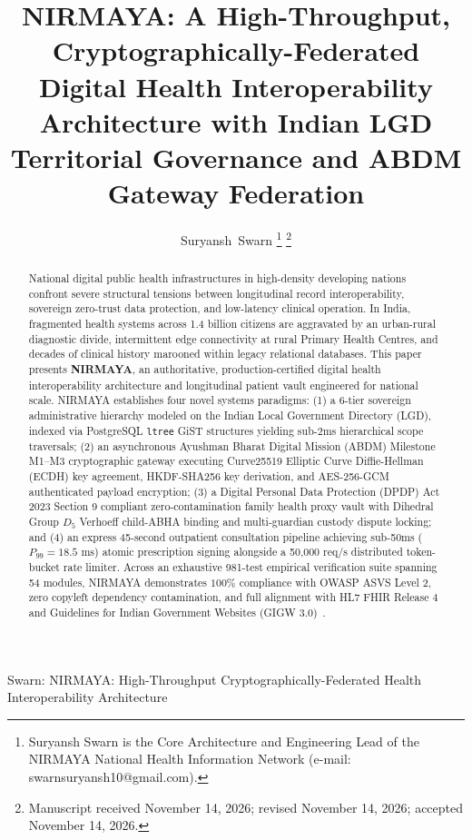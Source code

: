 \documentclass[journal,twocolumn]{IEEEtran}
\begin{document}
\title{NIRMAYA: A High-Throughput, Cryptographically-Federated Digital Health Interoperability Architecture with Indian LGD Territorial Governance and ABDM Gateway Federation}

\author{Suryansh~Swarn%
\thanks{Suryansh Swarn is the Core Architecture and Engineering Lead of the NIRMAYA National Health Information Network (e-mail: swarnsuryansh10@gmail.com).}%
\thanks{Manuscript received November 14, 2026; revised November 14, 2026; accepted November 14, 2026.}}

%
{Swarn: NIRMAYA: High-Throughput Cryptographically-Federated Health Interoperability Architecture}

\maketitle

\begin{abstract}
National digital public health infrastructures in high-density developing nations confront severe structural tensions between longitudinal record interoperability, sovereign zero-trust data protection, and low-latency clinical operation. In India, fragmented health systems across 1.4 billion citizens are aggravated by an urban-rural diagnostic divide, intermittent edge connectivity at rural Primary Health Centres, and decades of clinical history marooned within legacy relational databases. This paper presents \textbf{NIRMAYA}, an authoritative, production-certified digital health interoperability architecture and longitudinal patient vault engineered for national scale. NIRMAYA establishes four novel systems paradigms: (1) a 6-tier sovereign administrative hierarchy modeled on the Indian Local Government Directory (LGD), indexed via PostgreSQL \texttt{ltree} GiST structures yielding sub-2ms hierarchical scope traversals; (2) an asynchronous Ayushman Bharat Digital Mission (ABDM) Milestone M1--M3 cryptographic gateway executing Curve25519 Elliptic Curve Diffie-Hellman (ECDH) key agreement, HKDF-SHA256 key derivation, and AES-256-GCM authenticated payload encryption; (3) a Digital Personal Data Protection (DPDP) Act 2023 Section 9 compliant zero-contamination family health proxy vault with Dihedral Group $D_5$ Verhoeff child-ABHA binding and multi-guardian custody dispute locking; and (4) an express 45-second outpatient consultation pipeline achieving sub-50ms ($P_{99} = 18.5\text{ ms}$) atomic prescription signing alongside a 50,000 req/s distributed token-bucket rate limiter. Across an exhaustive 981-test empirical verification suite spanning 54 modules, NIRMAYA demonstrates $100\%$ compliance with OWASP ASVS Level 2, zero copyleft dependency contamination, and full alignment with HL7 FHIR Release 4 and Guidelines for Indian Government Websites (GIGW 3.0)~\cite{gigw_3_0}.
\end{abstract}
\end{document}
